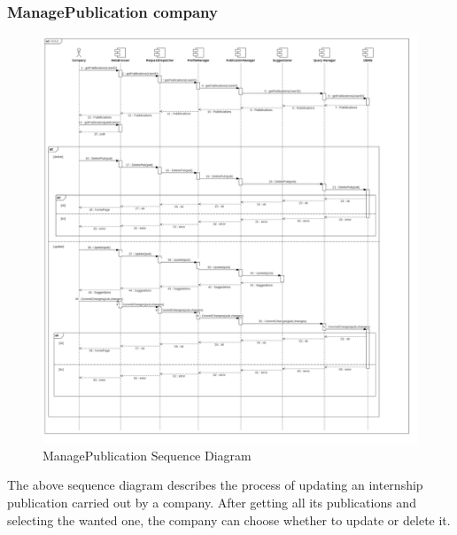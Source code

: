 \documentclass{article}
\begin{document}
\subsubsection{ManagePublication company}
\begin{figure}[H]
    \centering
    \includegraphics[width=1\linewidth]{SequenceDiagram/UC12.jpg}
    \caption{ManagePublication Sequence Diagram}
    \label{fig:enter-label}
\end{figure}
The above sequence diagram describes the process of updating an internship publication carried out by a company. After getting all its publications and selecting the wanted one, the company can choose whether to update or delete it. 
\end{document}
